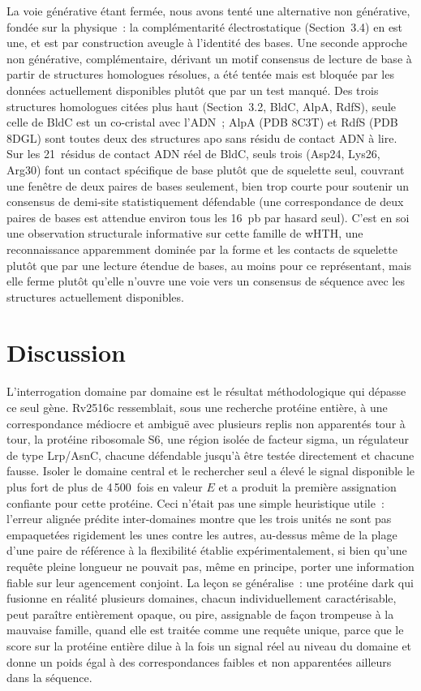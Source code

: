 \documentclass[11pt,a4paper]{article}
\begin{document}
La voie générative étant fermée, nous avons tenté une alternative non générative, fondée sur la
physique~: la complémentarité électrostatique (Section~3.4) en est une, et est par construction
aveugle à l'identité des bases. Une seconde approche non générative, complémentaire, dérivant un
motif consensus de lecture de base à partir de structures homologues résolues, a été tentée mais est
bloquée par les données actuellement disponibles plutôt que par un test manqué. Des trois structures
homologues citées plus haut (Section~3.2, BldC, AlpA, RdfS), seule celle de BldC est un co-cristal
avec l'ADN~; AlpA (PDB 8C3T) et RdfS (PDB 8DGL) sont toutes deux des structures apo sans résidu de
contact ADN à lire. Sur les 21~résidus de contact ADN réel de BldC, seuls trois (Asp24, Lys26,
Arg30) font un contact spécifique de base plutôt que de squelette seul, couvrant une fenêtre de deux
paires de bases seulement, bien trop courte pour soutenir un consensus de demi-site statistiquement
défendable (une correspondance de deux paires de bases est attendue environ tous les 16~pb par
hasard seul). C'est en soi une observation structurale informative sur cette famille de wHTH, une
reconnaissance apparemment dominée par la forme et les contacts de squelette plutôt que par une
lecture étendue de bases, au moins pour ce représentant, mais elle ferme plutôt qu'elle n'ouvre une
voie vers un consensus de séquence avec les structures actuellement disponibles.

\section{Discussion}

L'interrogation domaine par domaine est le résultat méthodologique qui dépasse ce seul gène.
Rv2516c ressemblait, sous une recherche protéine entière, à une correspondance médiocre et ambiguë
avec plusieurs replis non apparentés tour à tour, la protéine ribosomale S6, une région isolée de
facteur sigma, un régulateur de type Lrp/AsnC, chacune défendable jusqu'à être testée directement
et chacune fausse. Isoler le domaine central et le rechercher seul a élevé le signal disponible le
plus fort de plus de 4\,500~fois en valeur $E$ et a produit la première assignation confiante pour
cette protéine. Ceci n'était pas une simple heuristique utile~: l'erreur alignée prédite
inter-domaines montre que les trois unités ne sont pas empaquetées rigidement les unes contre les
autres, au-dessus même de la plage d'une paire de référence à la flexibilité établie
expérimentalement, si bien qu'une requête pleine longueur ne pouvait pas, même en principe, porter
une information fiable sur leur agencement conjoint. La leçon se généralise~: une protéine dark qui fusionne en réalité plusieurs
domaines, chacun individuellement caractérisable, peut paraître entièrement opaque, ou pire,
assignable de façon trompeuse à la mauvaise famille, quand elle est traitée comme une requête
unique, parce que le score sur la protéine entière dilue à la fois un signal réel au niveau du
domaine et donne un poids égal à des correspondances faibles et non apparentées ailleurs dans la
séquence.
\end{document}
